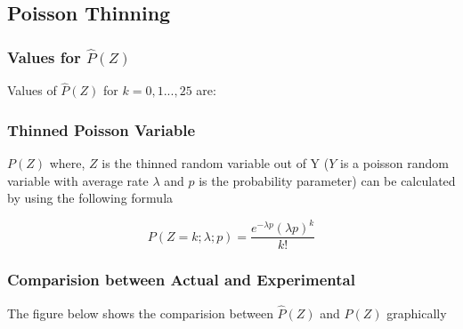 \documentclass[a4paper]{article}
\begin{document}
\subsection{Poisson Thinning}

\subsubsection{Values for $\hat{P}(Z)$}

Values of $\hat{P}(Z)$ for $k=0, 1 ... ,25$ are:


\subsubsection{Thinned Poisson Variable}

$P(Z)$ where, $Z$ is the thinned random variable out of Y ($Y$ is a poisson random variable with average rate $\lambda$ and $p$ is the probability parameter) can be calculated by using the following formula

$$ P(Z=k; \lambda; p) = \frac{e^{-\lambda p}{(\lambda p)}^{k}} {k!}$$

\subsubsection{Comparision between Actual and Experimental}
The figure below shows the comparision between $\hat{P}(Z)$ and $P(Z)$ graphically

\begin{figure}[H]
	\centering
	\begin{floatrow}
	\end{floatrow}
\end{figure}
\end{document}
